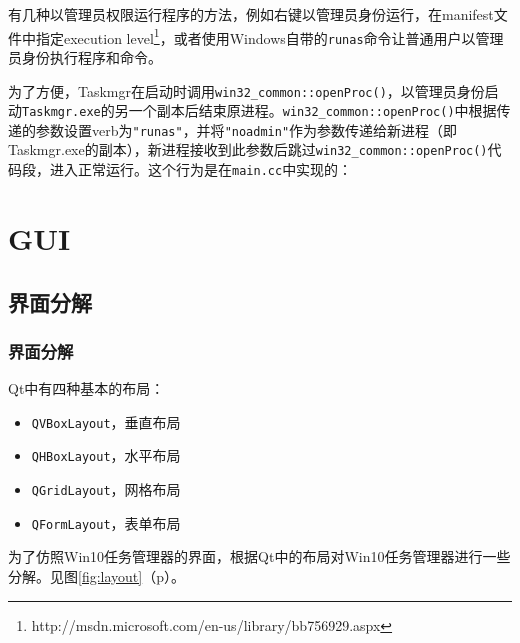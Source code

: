 \documentclass{beamer}
\newcommand\code[1]{\texttt{#1}}
\newcommand\myref[1]{\ref{#1}（p\pageref{#1}）}
\begin{document}
\begin{frame}
    
有几种以管理员权限运行程序的方法，例如右键以管理员身份运行，在manifest文件中指定execution level\footnote{http://msdn.microsoft.com/en-us/library/bb756929.aspx}，或者使用Windows自带的\code{runas}命令让普通用户以管理员身份执行程序和命令。

为了方便，Taskmgr在启动时调用\code{win32\_common::openProc()}，以管理员身份启动\code{Taskmgr.exe}的另一个副本后结束原进程。\code{win32\_common::openProc()}中根据传递的参数设置verb为\code{"runas"}，并将\code{"noadmin"}作为参数传递给新进程（即Taskmgr.exe的副本），新进程接收到此参数后跳过\code{win32\_common::openProc()}代码段，进入正常运行。这个行为是在\code{main.cc}中实现的：
\end{frame}

\begin{frame}
    
{
    \ttfamily
    
}
\end{frame}

\section{GUI}
\label{sec:gui}
\subsection{界面分解}
\begin{frame}
    \frametitle{界面分解}
    Qt中有四种基本的布局：

\begin{itemize}
    \item \code{QVBoxLayout}，垂直布局
    \item \code{QHBoxLayout}，水平布局
    \item \code{QGridLayout}，网格布局
    \item \code{QFormLayout}，表单布局
\end{itemize}

为了仿照Win10任务管理器的界面，根据Qt中的布局对Win10任务管理器进行一些分解。见图\myref{fig:layout}。
\end{frame}
\end{document}
